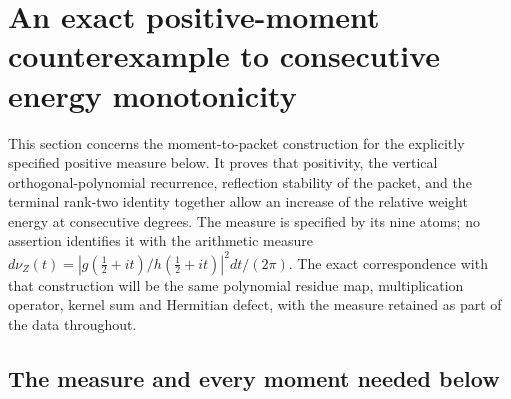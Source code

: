 \section{An exact positive-moment counterexample to consecutive energy monotonicity}
\label{sec:terminal-energy-counterexample}

This section concerns the moment-to-packet construction for the explicitly
specified positive measure below.  It proves that positivity, the vertical
orthogonal-polynomial recurrence, reflection stability of the packet, and
the terminal rank-two identity together allow an increase of the relative
weight energy at consecutive degrees.  The measure is specified by its nine
atoms; no assertion identifies it with the arithmetic measure
\(d\nu_Z(t)=|g(\tfrac12+it)/h(\tfrac12+it)|^2dt/(2\pi)\).
The exact correspondence with that construction will be the same polynomial
residue map, multiplication operator, kernel sum and Hermitian defect, with
the measure retained as part of the data throughout.

\subsection{The measure and every moment needed below}

